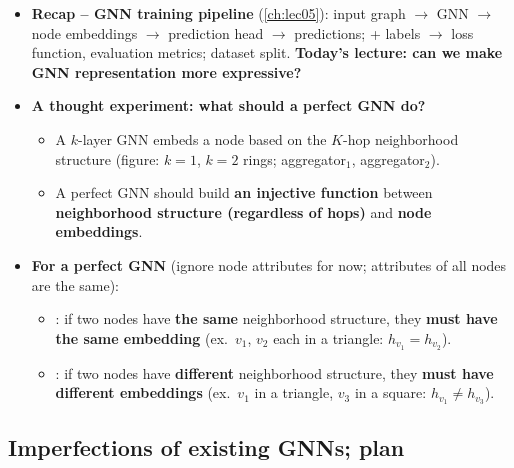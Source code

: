\begin{itemize}
  \item \textbf{Recap -- GNN training pipeline} (\cref{ch:lec05}): input graph
    $\to$ GNN $\to$ node embeddings $\to$ prediction head $\to$ predictions;
    + labels $\to$ loss function, evaluation metrics; dataset split.
    \textbf{Today's lecture: can we make GNN representation more expressive?}
  \item \textbf{A thought experiment: what should a perfect GNN do?}
    \begin{itemize}
      \item A $k$-layer GNN embeds a node based on the $K$-hop neighborhood
        structure (figure: $k=1$, $k=2$ rings; aggregator$_1$, aggregator$_2$).
      \item A perfect GNN should build \textbf{an injective function} between
        \textbf{neighborhood structure (regardless of hops)} and \textbf{node
        embeddings}.
    \end{itemize}
  \item \textbf{For a perfect GNN} (ignore node attributes for now; attributes of
    all nodes are the same):
    \begin{itemize}
      \item {}: if two nodes have \textbf{the same} neighborhood
        structure, they \textbf{must have the same embedding} (ex.\ $v_1$, $v_2$
        each in a triangle: $h_{v_1}=h_{v_2}$).
      \item {}: if two nodes have \textbf{different}
        neighborhood structure, they \textbf{must have different embeddings}
        (ex.\ $v_1$ in a triangle, $v_3$ in a square: $h_{v_1}\neq h_{v_3}$).
    \end{itemize}
\end{itemize}

\subsection{Imperfections of existing GNNs; plan}\label{sec:lec07-imperfect}

